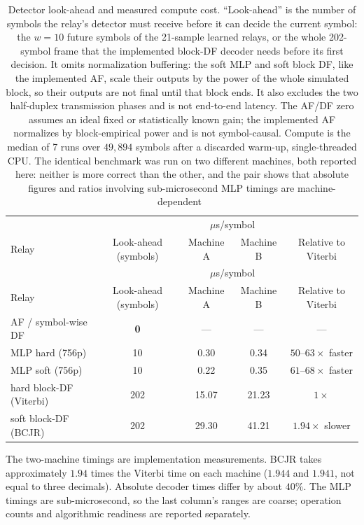 {\setlength{\tabcolsep}{4pt}\begin{longtable}[]{@{}lcccc@{}}
\caption[Relay look-ahead and compute cost of the coded relays]{Detector look-ahead and measured compute cost. ``Look-ahead'' is the number of symbols the relay's detector must receive before it can decide the current symbol: the $w=10$ future symbols of the 21-sample learned relays, or the whole 202-symbol frame that the implemented block-DF decoder needs before its first decision. It omits normalization buffering: the soft MLP and soft block DF, like the implemented AF, scale their outputs by the power of the whole simulated block, so their outputs are not final until that block ends. It also excludes the two half-duplex transmission phases and is not end-to-end latency. The AF/DF zero assumes an ideal fixed or statistically known gain; the implemented AF normalizes by block-empirical power and is not symbol-causal. Compute is the median of 7 runs over $49{,}894$ symbols after a discarded warm-up, single-threaded CPU. The identical benchmark was run on two different machines, both reported here: neither is more correct than the other, and the pair shows that absolute figures and ratios involving sub-microsecond MLP timings are machine-dependent~}\label{tbl:table41}\tabularnewline
\toprule\noalign{}
 &  & \multicolumn{2}{c}{$\mu$s/symbol} &  \\
Relay & Look-ahead (symbols) & Machine A & Machine B & Relative to Viterbi \\
\midrule\noalign{}
\endfirsthead
\toprule\noalign{}
 &  & \multicolumn{2}{c}{$\mu$s/symbol} &  \\
Relay & Look-ahead (symbols) & Machine A & Machine B & Relative to Viterbi \\
\midrule\noalign{}
\endhead
\bottomrule\noalign{}
\endlastfoot
AF / symbol-wise DF & \textbf{0} & --- & --- & --- \\
MLP hard (756p) & 10 & 0.30 & 0.34 & $50$--$63\times$ faster \\
MLP soft (756p) & 10 & 0.22 & 0.35 & $61$--$68\times$ faster \\
hard block-DF (Viterbi) & 202 & 15.07 & 21.23 & $1\times$ \\
soft block-DF (BCJR) & 202 & 29.30 & 41.21 & $1.94\times$ slower \\
\end{longtable}}

The two-machine timings are implementation measurements. BCJR takes approximately $1.94$ times the Viterbi time on each machine ($1.944$ and $1.941$, not equal to three decimals). Absolute decoder times differ by about $40\%$. The MLP timings are sub-microsecond, so the last column's ranges are coarse; operation counts and algorithmic readiness are reported separately.



